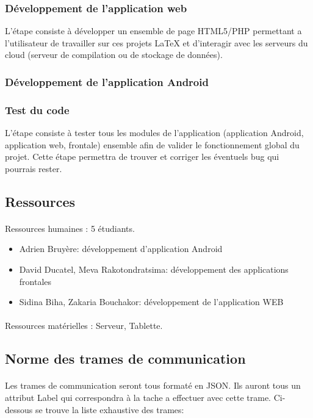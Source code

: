 \documentclass[a4paper,12pt]{article}
\begin{document}
\subsubsection{Développement de l'application web}
L'étape consiste à développer un ensemble de page HTML5/PHP permettant a l'utilisateur de travailler sur ces projets LaTeX et d’interagir avec les serveurs du cloud (serveur de compilation ou de stockage de données).

\subsubsection{Développement de l'application Android}


\subsubsection{Test du code}
L'étape consiste à tester tous les modules de l'application (application Android, application web, frontale) ensemble afin de valider le fonctionnement global du projet. Cette étape permettra de trouver et corriger 
les éventuels bug qui pourrais rester.

\subsection{Ressources}
\paragraph*{}
Ressources humaines : 5 étudiants.
\begin{itemize}
 \item Adrien Bruyère: développement d'application Android
 \item David Ducatel, Meva Rakotondratsima: développement des applications frontales
 \item Sidina Biha, Zakaria Bouchakor: développement de l'application WEB
\end{itemize}

\paragraph*{}
Ressources matérielles : Serveur, Tablette.

\subsection{Norme des trames de communication}
\paragraph*{}
Les trames de communication seront tous formaté en JSON. Ils auront tous un
attribut Label qui correspondra à la tache a effectuer avec cette trame.
Ci-dessous se trouve la liste exhaustive des trames:
\end{document}
